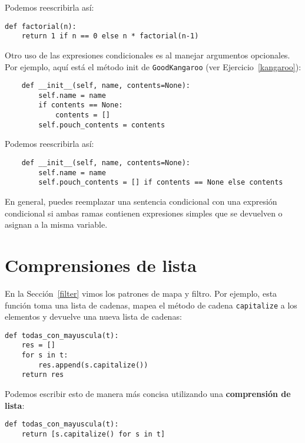 \documentclass[10pt]{book}
\begin{document}
Podemos reescribirla así:

\begin{verbatim}
def factorial(n):
    return 1 if n == 0 else n * factorial(n-1)
\end{verbatim}

Otro uso de las expresiones condicionales es al manejar argumentos
opcionales.  Por ejemplo, aquí está el método init de
{\tt GoodKangaroo} (ver Ejercicio~\ref{kangaroo}):

\begin{verbatim}
    def __init__(self, name, contents=None):
        self.name = name
        if contents == None:
            contents = []
        self.pouch_contents = contents
\end{verbatim}

Podemos reescribirla así:

\begin{verbatim}
    def __init__(self, name, contents=None):
        self.name = name
        self.pouch_contents = [] if contents == None else contents
\end{verbatim}

En general, puedes reemplazar una sentencia condicional con una expresión
condicional si ambas ramas contienen expresiones simples que se
devuelven o asignan a la misma variable.



\section{Comprensiones de lista}

En la Sección~\ref{filter} vimos los patrones de mapa y filtro.  Por
ejemplo, esta función toma una lista de cadenas, mapea el método de cadena
{\tt capitalize} a los elementos y devuelve una nueva lista de cadenas:

\begin{verbatim}
def todas_con_mayuscula(t):
    res = []
    for s in t:
        res.append(s.capitalize())
    return res
\end{verbatim}

Podemos escribir esto de manera más concisa utilizando una {\bf comprensión de lista}:

\begin{verbatim}
def todas_con_mayuscula(t):
    return [s.capitalize() for s in t]
\end{verbatim}
\end{document}
